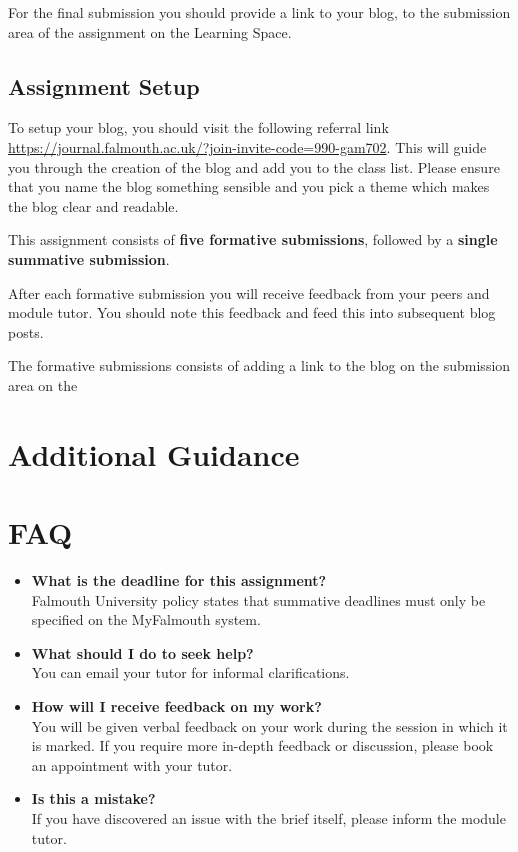 \documentclass{../../fal_assignment}
\begin{document}
For the final submission you should provide a link to your blog, to the submission area of the assignment on the Learning Space. 

\subsection*{Assignment Setup} 

To setup your blog, you should visit the following referral link \url{https://journal.falmouth.ac.uk/?join-invite-code=990-gam702}. This will guide you
through the creation of the blog and add you to the class list. Please ensure that you name the blog something sensible and you pick a theme which makes the blog clear and readable.

This assignment consists of \textbf{five formative submissions}, followed by a \textbf{single summative submission}.

After each formative submission you will receive feedback from your peers and module tutor. You should note this feedback and feed this into subsequent blog posts.  

The formative submissions consists of adding a link to the blog on the submission area on the 


\section*{Additional Guidance}



\section*{FAQ}

\begin{itemize}
	\item 	\textbf{What is the deadline for this assignment?} \\ 
    		Falmouth University policy states that summative deadlines must only be specified on the MyFalmouth system.
    		
	\item 	\textbf{What should I do to seek help?} \\ 
    		You can email your tutor for informal clarifications.  
    		
	\item 	\textbf{How will I receive feedback on my work?} \\ 
    		You will be given verbal feedback on your work during the session in which it is marked.
    		If you require more in-depth feedback or discussion, please book an appointment with your tutor.
    		
    	\item 	\textbf{Is this a mistake?} \\ 	
    		If you have discovered an issue with the brief itself, please inform the module tutor.
\end{itemize}
\end{document}
